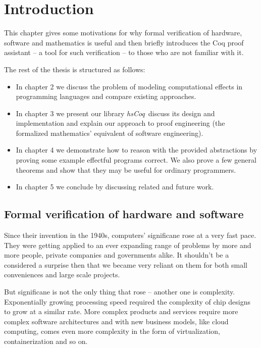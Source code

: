 \documentclass[declaration,inz,english,shortabstract]{iithesis}
\author         {Zeimer}
\date           {10 września 2019}                     %
\newcommand{\libname}{\textit{hsCoq}}
\begin{document}

\chapter{Introduction}

This chapter gives some motivations for why formal verification of hardware, software and mathematics is useful and then briefly introduces the Coq proof assistant -- a tool for such verification -- to those who are not familiar with it.

The rest of the thesis is structured as follows:

\begin{itemize}
    \item In chapter 2 we discuss the problem of modeling computational effects in programming languages and compare existing approaches.
    \item In chapter 3 we present our library \libname\, discuss its design and implementation and explain our approach to proof engineering (the formalized mathematics' equivalent of software engineering).
    \item In chapter 4 we demonstrate how to reason with the provided abstractions by proving some example effectful programs correct. We also prove a few general theorems and show that they may be useful for ordinary programmers.
    \item In chapter 5 we conclude by discussing related and future work.
\end{itemize}

\section{Formal verification of hardware and software}

Since their invention in the 1940s, computers' significane rose at a very fast pace. They were getting applied to an ever expanding range of problems by more and more people, private companies and governments alike. It shouldn't be a considered a surprise then that we became very reliant on them for both small conveniences and large scale projects.

But significane is not the only thing that rose -- another one is complexity. Exponentially growing processing speed required the complexity of chip designs to grow at a similar rate. More complex products and services require more complex software architectures and with new business models, like cloud computing, comes even more complexity in the form of virtualization, containerization and so on.
\end{document}
